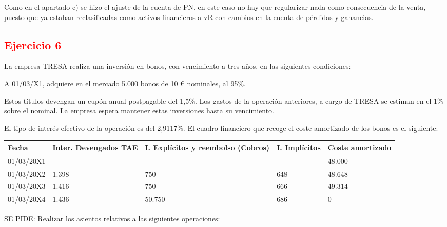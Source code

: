 \begin{tcolorbox}
    Como en el apartado c) se hizo el ajuste de la cuenta de PN, en este caso no hay que regularizar nada como consecuencia de la venta, puesto que ya estaban reclasificadas como activos financieros a vR con cambios en la cuenta de pérdidas y ganancias.
\end{tcolorbox}

\newpage
\subsection*{\textcolor{red}{\textbf{Ejercicio 6}}}

La empresa TRESA realiza una inversión en bonos, con vencimiento a tres años, en las siguientes condiciones:

A 01/03/X1, adquiere en el mercado 5.000 bonos de 10 € nominales, al 95\%.

Estos títulos devengan un cupón anual postpagable del 1,5\%. Los gastos de la operación anteriores, a cargo de TRESA se estiman en el 1\% sobre el nominal. La empresa espera mantener estas inversiones hasta su vencimiento.

El tipo de interés efectivo de la operación es del 2,9117\%. El cuadro financiero que recoge el coste amortizado de los bonos es el siguiente:

\begin{table}[H]
\centering
\begin{tabular}{|p{2cm}|p{2cm}|p{2cm}|p{2cm}|p{2cm}|}
    \hline
    Fecha & Inter. Devengados TAE & I. Explícitos y reembolso (Cobros) & I. Implícitos & Coste amortizado \\
    \hline
    01/03/20X1 & & & & 48.000 \\
    \hline
    01/03/20X2 & 1.398 & 750 & 648 & 48.648 \\
    \hline
    01/03/20X3 & 1.416 & 750 & 666 & 49.314 \\
    \hline
    01/03/20X4 & 1.436 & 50.750 & 686 & 0 \\
    \hline
\end{tabular}
\end{table}

SE PIDE: Realizar los asientos relativos a las siguientes operaciones:

